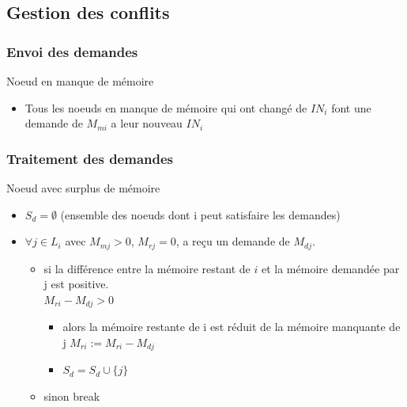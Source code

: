 \documentclass[10pt, c]{beamer}
\begin{document}
    \subsection{Gestion des conflits}
    \subsubsection{Envoi des demandes}
        	\begin{frame}{Noeud en manque de mémoire}
        	    \begin{itemize}
        	        \item Tous les noeuds en manque de mémoire qui ont changé de $IN_i$ font une demande de $M_{mi}$ a leur nouveau $IN_i$
        	    \end{itemize}
        	\end{frame}
    \subsubsection{Traitement des demandes}
        	\begin{frame}{Noeud avec surplus de mémoire}
        	    \begin{itemize}
        	        \item  $S_d = \emptyset$ (ensemble des noeuds dont i peut satisfaire les demandes)
        	        \item   $\forall j \in L_i$ avec $M_{mj} >0$, $M_{rj} = 0$,  a reçu un demande de $M_{dj}$.
        	        \begin{itemize}
        	            \item si la différence entre la mémoire restant de $i$ et la mémoire demandée par j est positive.\\
        	            $M_{ri} - M_{dj}>0$ 
        	            \begin{itemize}
        	                \item alors la mémoire restante de i est réduit de la mémoire manquante de j  $M_{ri} :=M_{ri} - M_{dj}$
        	                \item $S_d = S_d \cup \{j\}$
        	            \end{itemize}
        	            \item sinon break
        	        \end{itemize}
        	    \end{itemize}
        	\end{frame}
\end{document}
